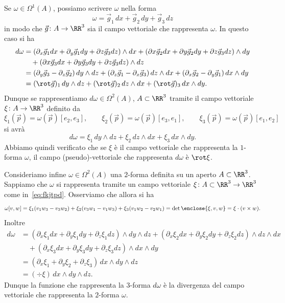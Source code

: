 Se $\omega\in \Omega^1(A)$, possiamo scrivere $\omega$ nella forma 
\[
 \omega = \vec g_1\, dx + \vec g_2\, dy + \vec g_3\, dz
\]
in modo che $\vec g \colon A\to\RR^3$ sia il campo vettoriale che rappresenta $\omega$.
In questo caso si ha 
\begin{align*}
    d\omega &= (\partial_x \vec g_1 dx + \partial_y \vec g_1 dy + \partial z \vec g_3 dz)\wedge dx 
    + (\partial x \vec g_2 dx + \partial y \vec g_2 dy + \partial z \vec g_3 dz)\wedge dy \\
    & \quad + (\partial x \vec g_3 dx + \partial y \vec g_3 dy + \partial z \vec g_3 dz)\wedge dz \\    
    &= (\partial_y \vec g_3 - \partial_z \vec g_2)\, dy \wedge dz
       + (\partial_z \vec g_1 - \partial_x \vec g_3)\, dz\wedge dx 
       + (\partial_x \vec g_2 - \partial_y \vec g_1)\, dx \wedge dy\\
    &= (\rot \vec g)_1 \, dy \wedge dz
       + (\rot \vec g)_2\, dz\wedge dx 
       + (\rot \vec g)_3\, dx \wedge dy.
\end{align*}
Dunque se rappresentiamo $d\omega\in \Omega^2(A)$, $A\subset\RR^3$ tramite 
il campo vettoriale $\xi\colon A\to \RR^3$
definito da 
\[
\xi_1(\vec p) = \omega(\vec p)[e_2,e_3], \qquad
\xi_2(\vec p) = \omega(\vec p)[e_3,e_1], \qquad
\xi_3(\vec p) = \omega(\vec p)[e_1,e_2]
\]
si avrà
\begin{equation}\label{eq:fkjtpd}
  d \omega = \xi_1\, dy \wedge dz + \xi_2\, dz\wedge dx + \xi_3\, dx\wedge dy.
\end{equation}
Abbiamo quindi verificato che se $\xi$ è il campo vettoriale che rappresenta 
la $1$-forma $\omega$, il campo (pseudo)-vettoriale che rappresenta $d\omega$
è $\rot \xi$.

Consideriamo infine $\omega \in \Omega^2(A)$ una $2$-forma 
definita su un aperto $A\subset\RR^3$.
Sappiamo che $\omega$ si rappresenta tramite un campo
vettoriale $\xi \colon A \subset \RR^3 \to \RR^3$  
come in~\eqref{eq:fkjtpd}.
Osserviamo che allora si ha 
\[
  \omega[v,w] 
  = \xi_1 (v_1 w_3 - v_3 w_2) + \xi_2 (v_3 w_1 - v_1 w_3)
   + \xi_3 (v_1 w_2 - v_2 w_1) 
   = \det \enclose{\xi, v, w} = \xi \cdot (v\times w).
\]
Inoltre
\begin{align*}
 d\omega &= (\partial_x \xi_1 dx + \partial_y \xi_1 dy + \partial_z \xi_1 dz) \wedge dy \wedge dz 
        + (\partial_x \xi_2 dx + \partial_y \xi_2 dy + \partial_z \xi_2 dz) \wedge dz \wedge dx \\
    &\quad + (\partial_x \xi_3 dx + \partial_y \xi_3 dy + \partial_z \xi_3 dz) \wedge dx \wedge dy \\
    &= (\partial_x \xi_1 + \partial_y \xi_2 + \partial_z \xi_3)\, dx \wedge dy \wedge dz\\
    &= (\div \xi)\, dx \wedge dy \wedge dz.
\end{align*}
Dunque la funzione che rappresenta la $3$-forma $d\omega$ 
è la divergenza del campo vettoriale che rappresenta la $2$-forma $\omega$.

